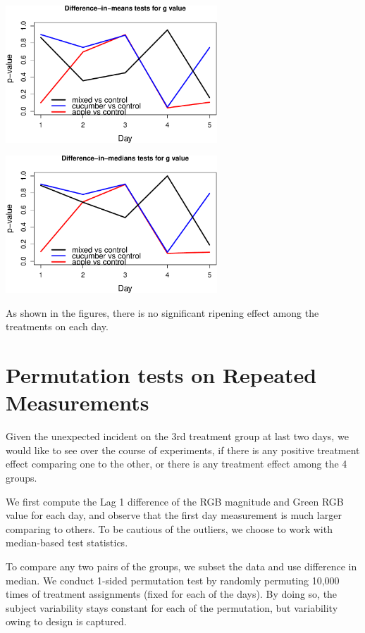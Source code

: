 \documentclass[
  12pt,
]{article}
\begin{document}
\includegraphics[width=300px]{report_files/figure-latex/unnamed-chunk-16-1}

\includegraphics[width=300px]{report_files/figure-latex/unnamed-chunk-17-1}

As shown in the figures, there is no significant ripening effect among
the treatments on each day.

\hypertarget{permutation-tests-on-repeated-measurements}{%
\section{Permutation tests on Repeated
Measurements}\label{permutation-tests-on-repeated-measurements}}

Given the unexpected incident on the 3rd treatment group at last two
days, we would like to see over the course of experiments, if there is
any positive treatment effect comparing one to the other, or there is
any treatment effect among the 4 groups.

We first compute the Lag 1 difference of the RGB magnitude and Green RGB
value for each day, and observe that the first day measurement is much
larger comparing to others. To be cautious of the outliers, we choose to
work with median-based test statistics.

To compare any two pairs of the groups, we subset the data and use
difference in median. We conduct 1-sided permutation test by randomly
permuting 10,000 times of treatment assignments (fixed for each of the
days). By doing so, the subject variability stays constant for each of
the permutation, but variability owing to design is captured.
\end{document}

